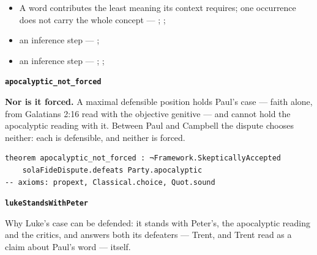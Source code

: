 \documentclass[11pt]{article}
\begin{document}
\begin{itemize}
\begin{itemize}
\item A word contributes the least meaning its context requires; one occurrence does not carry the whole concept --- \cite{silva-biblical-words-1994}; \cite{joos-semantic-axiom-1972}; \cite{barr-semantics-2004}
\item an inference step --- \cite[ad loc. Rom 4:6]{moo-romans-1996}; \cite[s.v. λογίζομαι]{bauer-danker-lexicon-2000}
\item an inference step --- \cite{silva-biblical-words-1994}; \cite[p. 80]{moo-romans-1996}; \cite{barr-semantics-2004}
\end{itemize}
\end{itemize}
\par\medskip\noindent\textbf{\texttt{apocalyptic\_\allowbreak{}not\_\allowbreak{}forced}}\par\nobreak\noindent
\textbf{Nor is it forced.} A maximal defensible position holds Paul's case — faith alone, from Galatians 2:16 read with the objective genitive — and cannot hold the apocalyptic reading with it. Between Paul and Campbell the dispute chooses neither: each is defensible, and neither is forced.

{\small\begin{verbatim}
theorem apocalyptic_not_forced : ¬Framework.SkepticallyAccepted
    solaFideDispute.defeats Party.apocalyptic
-- axioms: propext, Classical.choice, Quot.sound
\end{verbatim}}
\par\medskip\noindent\textbf{\texttt{luke\allowbreak{}Stands\allowbreak{}With\allowbreak{}Peter}}\par\nobreak\noindent
Why Luke's case can be defended: it stands with Peter's, the apocalyptic reading and the critics, and answers both its defeaters — Trent, and Trent read as a claim about Paul's word — itself.
\end{document}
